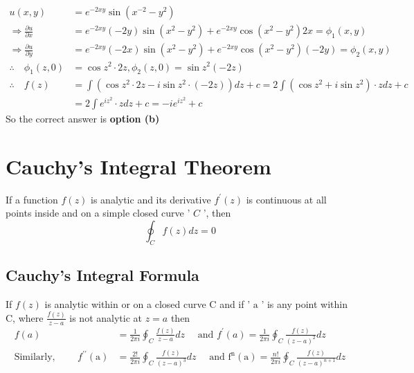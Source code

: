 	\begin{answer}
		\begin{align*}
		u(x, y)&=e^{-2 x y} \sin \left(x^{-2}-y^{2}\right) \\
		\Rightarrow \frac{\partial u}{\partial x}&=e^{-2 x y}(-2 y) \sin \left(x^{2}-y^{2}\right)+e^{-2 x y} \cos \left(x^{2}-y^{2}\right) 2 x=\phi_{1}(x, y) \\
		\Rightarrow \frac{\partial u}{\partial y}&=e^{-2 x y}(-2 x) \sin \left(x^{2}-y^{2}\right)+e^{-2 x y} \cos \left(x^{2}-y^{2}\right)(-2 y)=\phi_{2}(x, y)\\
		\therefore \quad \phi_{1}(z, 0) &=\cos z^{2} \cdot 2 z, \phi_{2}(z, 0)=\sin z^{2}(-2 z) \\
		\therefore \quad f(z) &=\int\left(\cos z^{2} \cdot 2 z-i \sin z^{2} \cdot(-2 z)\right) d z+c=2 \int\left(\cos z^{2}+i \sin z^{2}\right) \cdot z d z+c \\
		&=2 \int e^{i z^{2}} \cdot z d z+c=-i e^{i z^{2}}+c
		\end{align*}
		So the correct answer is \textbf{option (b)}
	\end{answer}
\section{Cauchy's Integral Theorem}
If a function $f(z)$ is analytic and its derivative $f^{\prime}(z)$ is continuous at all points inside and on a simple closed curve ' $C$ ', then $$\oint_{C} f(z) d z=0$$
\subsection{Cauchy's Integral Formula}

	If $f(z)$ is analytic within or on a closed curve $\mathrm{C}$ and if ' $\mathrm{a}$ ' is any point within ${\mathrm{C}}$, where $\frac{f(z)}{z-a}$ is not analytic at $z=a$ then
	\begin{align*}
	f(a)&=\frac{1}{2 \pi i} \oint_{C} \frac{f(z)}{z-a} d z \quad \text { and } f^{\prime}(a)=\frac{1}{2 \pi i} \oint_{C} \frac{f(z)}{(z-a)^{2}} d z\\
	\text{Similarly, }\qquad f^{\prime \prime}(\mathrm{a})&=\frac{2 !}{2 \pi i} \oint_{C} \frac{f(z)}{(z-a)^{3}} d z \quad\text{ and } \mathrm{f}^{\mathrm{n}}(\mathrm{a})=\frac{n !}{2 \pi i} \oint_{C} \frac{f(z)}{(z-a)^{n+1}} d z
	\end{align*}

